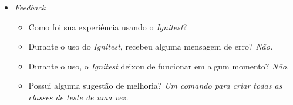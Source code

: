 \begin{itemize}
        \item \textit{Feedback}
            \begin{itemize}
                \item Como foi sua experiência usando o \textit{Ignitest}?
                
                \item Durante o uso do \textit{Ignitest}, recebeu alguma mensagem de erro?
                    \subitem \textit{Não.}
                
                \item Durante o uso, o \textit{Ignitest} deixou de funcionar em algum momento?
                    \subitem \textit{Não.}
                
                \item Possui alguma sugestão de melhoria?
                    \subitem \textit{Um comando para criar todas as classes de teste de uma vez.}

            \end{itemize}
    \end{itemize}
